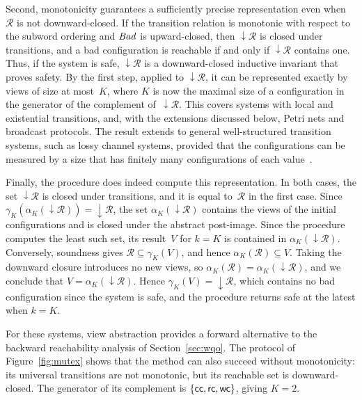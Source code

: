 Second, monotonicity guarantees a sufficiently precise representation even
when $\mathcal{R}$ is not downward-closed. If the transition relation is
monotonic with respect to the subword ordering and $\mathit{Bad}$ is upward-closed,
then ${\downarrow}\mathcal{R}$ is closed under transitions, and a bad
configuration is reachable if and only if ${\downarrow}\mathcal{R}$ contains
one. Thus, if the system is safe, ${\downarrow}\mathcal{R}$ is a
downward-closed inductive invariant that proves safety. By the first step,
applied to ${\downarrow}\mathcal{R}$, it can be represented exactly by views of
size at most~$K$, where $K$ is now the maximal
size of a configuration in the generator of the complement
of~${\downarrow}\mathcal{R}$. This covers systems with local and existential
transitions, and, with the extensions discussed below, Petri nets and
broadcast protocols. The result extends to general well-structured transition
systems, such as lossy channel systems, provided that the configurations can be
measured by a size that has finitely many configurations of each
value~\cite{AHH16}.

Finally, the procedure does indeed compute this representation. In both
cases, the set ${\downarrow}\mathcal{R}$ is closed under transitions, and it
is equal to~$\mathcal{R}$ in the first case. Since
$\gamma_K(\alpha_K({\downarrow}\mathcal{R})) = {\downarrow}\mathcal{R}$, the
set $\alpha_K({\downarrow}\mathcal{R})$ contains the views of the initial
configurations and is closed under the abstract post-image. Since the
procedure computes the least such set, its result~$V$ for $k = K$ is contained
in $\alpha_K({\downarrow}\mathcal{R})$. Conversely, soundness gives
$\mathcal{R} \subseteq \gamma_K(V)$, and hence $\alpha_K(\mathcal{R})
\subseteq V$. Taking the downward closure introduces no new views, so
$\alpha_K(\mathcal{R}) = \alpha_K({\downarrow}\mathcal{R})$, and we conclude
that $V = \alpha_K({\downarrow}\mathcal{R})$. Hence $\gamma_K(V) =
{\downarrow}\mathcal{R}$, which contains no bad configuration since the system
is safe, and the procedure returns safe at the latest when $k = K$.

For these systems, view abstraction provides a forward alternative to
the backward reachability analysis of Section~\ref{sec:wqo}.
The protocol of Figure~\ref{fig:mutex} shows that the method can also
succeed without monotonicity: its universal transitions are not monotonic,
but its reachable set is downward-closed. The generator of its complement
is $\{\mathsf{c}\mathsf{c}, \mathsf{r}\mathsf{c}, \mathsf{w}\mathsf{c}\}$, giving $K = 2$.

